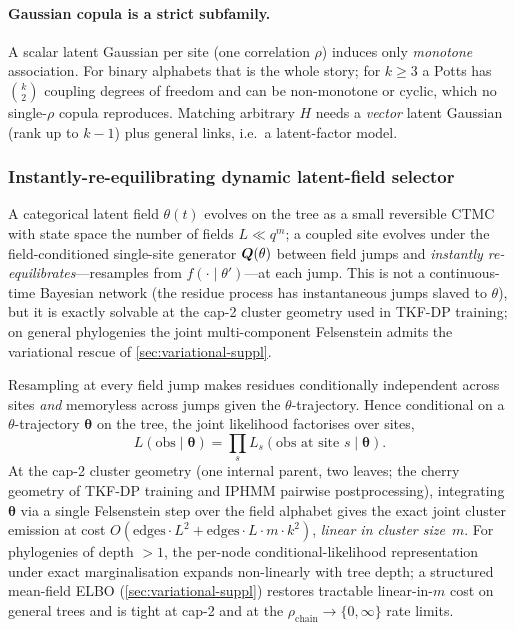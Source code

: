 \paragraph{Gaussian copula is a strict subfamily.} A scalar latent
Gaussian per site (one correlation $\rho$) induces only
\emph{monotone} association. For binary alphabets that is the whole
story; for $k\ge 3$ a Potts has $\binom{k}{2}$ coupling degrees of
freedom and can be non-monotone or cyclic, which no single-$\rho$
copula reproduces. Matching arbitrary $H$ needs a \emph{vector}
latent Gaussian (rank up to $k-1$) plus general links, i.e.\ a
latent-factor model.

\subsubsection{Instantly-re-equilibrating dynamic latent-field selector}
\label{sec:reequil-suppl}

A categorical latent field $\theta(t)$ evolves on the tree as a
small reversible CTMC with state space the number of fields
$L \ll q^m$; a coupled site evolves under the field-conditioned
single-site generator $\bm{Q}(\theta)$ between field jumps and
\emph{instantly re-equilibrates}---resamples from $f(\cdot\mid\theta')$---at
each jump. This is not a continuous-time Bayesian network (the
residue process has instantaneous jumps slaved to $\theta$), but it
is exactly solvable at the cap-2 cluster geometry used in TKF-DP
training; on general phylogenies the joint multi-component
Felsenstein admits the variational rescue of
\autoref{sec:variational-suppl}.

\begin{proposition}
\label{prop:hier-fels}
Resampling at every field jump makes residues conditionally
independent across sites \emph{and} memoryless across jumps given
the $\theta$-trajectory. Hence conditional on a $\theta$-trajectory
$\bm{\theta}$ on the tree, the joint likelihood factorises over
sites,
\begin{equation}
  L(\text{obs}\mid\bm{\theta}) = \prod_{s} L_s(\text{obs at site }s\mid\bm{\theta}).
\end{equation}
At the cap-2 cluster geometry (one internal parent, two leaves;
the cherry geometry of TKF-DP training and IPHMM pairwise
postprocessing), integrating $\bm{\theta}$ via a single Felsenstein
step over the field alphabet gives the exact joint cluster emission
at cost
$O(\mathrm{edges}\cdot L^2 + \mathrm{edges}\cdot L\cdot m\cdot k^2)$,
\emph{linear in cluster size}~$m$. For phylogenies of depth $>1$,
the per-node conditional-likelihood representation under exact
marginalisation expands non-linearly with tree depth; a structured
mean-field ELBO (\autoref{sec:variational-suppl}) restores
tractable linear-in-$m$ cost on general trees and is tight at
cap-2 and at the $\rho_{\text{chain}}\to\{0,\infty\}$ rate limits.
\end{proposition}

